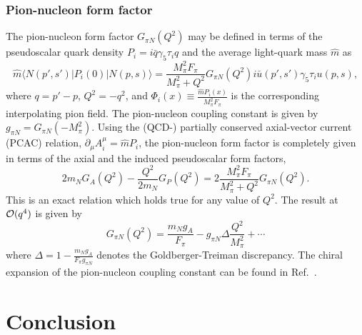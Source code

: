 \documentclass[twoside,12pt]{article}
\begin{document}
\subsubsection{Pion-nucleon form factor}
   The pion-nucleon form factor $G_{\pi N}(Q^2)$ may be defined in terms of
the pseudoscalar quark density $P_i=i\bar{q}\gamma_5 \tau_i q$ and
the average light-quark mass $\hat m$ as \cite{Gasser:1987rb}
\begin{equation}
\label{GpiN} \hat m \langle N(p',s')| P_i (0) | N(p,s) \rangle =
         \frac{M_\pi^2 F_\pi}{M_\pi^2 + Q^2}
         G_{\pi N}(Q^2)i\bar{u}(p',s') \gamma_5 \tau_i u(p,s),
\end{equation}
where $q=p'-p$, $Q^2=-q^2$, and $\Phi_i(x)\equiv \frac{\hat m P_i
(x)}{M_\pi^2 F_\pi}$ is the corresponding interpolating pion field.
   The pion-nucleon coupling constant is given by
$g_{\pi N}=G_{\pi N}(-M_\pi^2)$.
   Using the (QCD-) partially conserved axial-vector current (PCAC) relation,
$\partial_\mu A^\mu_i= \hat m P_i$, the pion-nucleon form factor
is completely given in terms of the axial and the induced
pseudoscalar form factors,
\begin{displaymath}
   2m_N G_A(Q^2) - \frac{Q^2}{2m_N} G_P(Q^2) =
       2\frac{M_\pi^2 F_\pi}{M_\pi^2 + Q^2} G_{\pi N}(Q^2).
\end{displaymath}
   This is an exact relation which holds true for any value of
   $Q^2$.
   The result at ${\cal O}(q^4)$ is given by \cite{Schindler:2006it}
\begin{displaymath}
\label{GpiNresult} G_{\pi N}(Q^2)=\frac{m_N g_A}{F_\pi}-g_{\pi
N}\Delta \frac{Q^2}{M_\pi^2} + \cdots
\end{displaymath}
where $\Delta=1-\frac{m_N g_A}{F_\pi g_{\pi N}}$ denotes the
Goldberger-Treiman discrepancy.
   The chiral expansion of the pion-nucleon coupling constant can
   be found in Ref.\ \cite{Schindler:2006it}.

\section{Conclusion}
\end{document}
